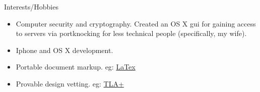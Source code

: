 \documentclass[11pt,oneside]{article}
\newenvironment{ressection}[1]{
        \vspace{4pt}
        {\fontfamily{phv}\selectfont\Large#1}
        \begin{itemize}
        \vspace{3pt}
}{
        \end{itemize}
}
\newcommand{\resitem}[1]{
        \vspace{-4pt}
        \item \begin{flushleft} #1 \end{flushleft}
}
\begin{document}
\begin{ressection}{Interests/Hobbies}

  \resitem{Computer security and cryptography. Created an OS X gui for
    gaining access to servers via portknocking for less technical
    people (specifically, my wife).}

  \resitem{Iphone and OS X development.}

  \resitem{Portable document markup. eg: \href{https://github.com/jstelzer/Resume/blob/master/stelzer-res.tex}{LaTex}}
  
  \resitem{Provable design vetting. eg: \href{https://lamport.azurewebsites.net/tla/high-level-view.html}{TLA+}}

\end{ressection}
\end{document}
